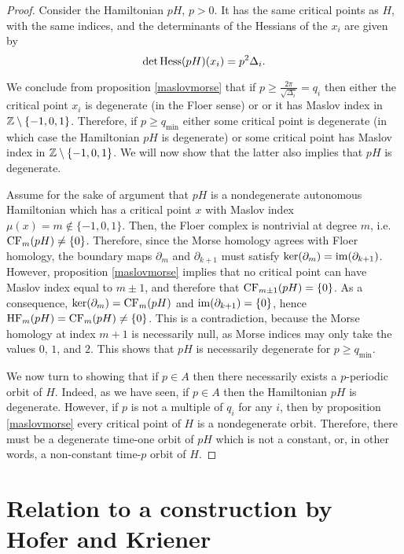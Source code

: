 \begin{proof}
Consider the Hamiltonian $p H$, $p > 0$. It has the same critical points as $H$, with the same indices, and the determinants of the Hessians of the $x_i$ are given by
\begin{equation}
\det \operatorname{Hess}(pH)(x_i) = p^2 \Delta_i.
\end{equation}

We conclude from proposition \ref{maslovmorse} that if $p \geq \frac{2\pi}{\sqrt{\Delta_i}} = q_i$ then either the critical point $x_i$ is degenerate (in the Floer sense) or or it has Maslov index in $\mathbb{Z} \setminus \{-1,0,1\}$. Therefore, if $p \geq q_{\min}$ either some critical point is degenerate (in which case the Hamiltonian $pH$ is degenerate) or some critical point has Maslov index in $\mathbb{Z} \setminus \{-1,0,1\}$. We will now show that the latter also implies that $pH$ is degenerate.

Assume for the sake of argument that $pH$ is a nondegenerate autonomous Hamiltonian which has a critical point $x$ with Maslov index $\mu(x) = m \not \in \{-1,0,1\}$. Then, the Floer complex is nontrivial at degree $m$, i.e. $\mathrm{CF}_m(pH) \neq \{0\}$. Therefore, since the Morse homology agrees with Floer homology, the boundary maps $\partial_m$ and $\partial_{k+1}$ must satisfy $\ker(\partial_m) = \operatorname{im}(\partial_{k+1})$. However, proposition \ref{maslovmorse} implies that no critical point can have Maslov index equal to $m \pm 1$, and therefore that $\mathrm{CF}_{m\pm1}(pH) = \{0\}$. As a consequence, $\ker(\partial_m) = \mathrm{CF}_m(pH)$ and $\operatorname{im}(\partial_{k+1}) = \{0\}$, hence $\mathrm{HF}_m(pH) = \mathrm{CF}_m(pH) \neq \{0\}$. This is a contradiction, because the Morse homology at index $m+1$ is necessarily null, as Morse indices may only take the values $0$, $1$, and $2$. This shows that $pH$ is necessarily degenerate for $p \geq q_{\min}$.

\smallskip

We now turn to showing that if $p \in A$ then there necessarily exists a $p$-periodic orbit of $H$. Indeed, as we have seen, if $p \in A$ then the Hamiltonian $pH$ is degenerate. However, if $p$ is not a multiple of $q_i$ for any $i$, then by proposition \ref{maslovmorse} every critical point of $H$ is a nondegenerate orbit. Therefore, there must be a degenerate time-one orbit of $pH$ which is not a constant, or, in other words, a non-constant time-$p$ orbit of $H$.
\end{proof}

\section{Relation to a construction by Hofer and Kriener}

